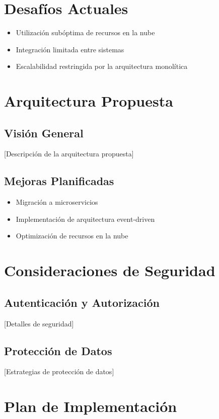 \section{Desafíos Actuales}
\begin{itemize}
    \item Utilización subóptima de recursos en la nube
    \item Integración limitada entre sistemas
    \item Escalabilidad restringida por la arquitectura monolítica
\end{itemize}

\section{Arquitectura Propuesta}
\subsection{Visión General}
[Descripción de la arquitectura propuesta]

\subsection{Mejoras Planificadas}
\begin{itemize}
    \item Migración a microservicios
    \item Implementación de arquitectura event-driven
    \item Optimización de recursos en la nube
\end{itemize}

\section{Consideraciones de Seguridad}
\subsection{Autenticación y Autorización}
[Detalles de seguridad]

\subsection{Protección de Datos}
[Estrategias de protección de datos]

\section{Plan de Implementación}
